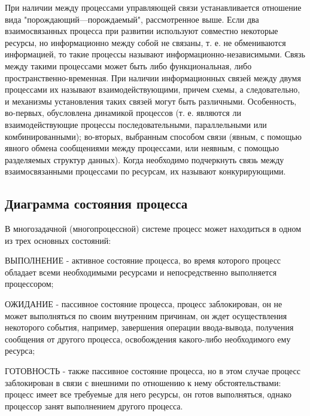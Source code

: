 При наличии между процессами управляющей связи устанавливается отношение вида "порождающий—порождаемый", рассмотренное выше. Если два взаимосвязанных процесса при развитии используют совместно некоторые ресурсы, но информационно между собой не связаны, т. е. не обмениваются информацией, то такие процессы называют информационно-независимыми. Связь между такими процессами может быть либо функциональная, либо пространственно-временная. При наличии информационных связей между двумя процессами их называют взаимодействующими, причем схемы, а следовательно, и механизмы установления таких связей могут быть различными. Особенность, во-первых, обусловлена динамикой процессов (т. е. являются ли взаимодействующие процессы последовательными, параллельными или комбинированными); во-вторых, выбранным способом связи (явным, с помощью явного обмена сообщениями между процессами, или неявным, с помощью разделяемых структур данных). Когда необходимо подчеркнуть связь между взаимосвязанными процессами по ресурсам, их называют конкурирующими.

\subsection{Диаграмма состояния процесса}

В многозадачной (многопроцессной) системе процесс может находиться в одном из трех основных состояний:

\begin{opr}
   ВЫПОЛНЕНИЕ - активное состояние процесса, во время которого процесс обладает всеми необходимыми ресурсами и непосредственно выполняется процессором;
\end{opr}

\begin{opr}
   ОЖИДАНИЕ - пассивное состояние процесса, процесс заблокирован, он не может выполняться по своим внутренним причинам, он ждет осуществления некоторого события, например, завершения операции ввода-вывода, получения сообщения от другого процесса, освобождения какого-либо необходимого ему ресурса;
\end{opr}

\begin{opr}
   ГОТОВНОСТЬ - также пассивное состояние процесса, но в этом случае процесс заблокирован в связи с внешними по отношению к нему обстоятельствами: процесс имеет все требуемые для него ресурсы, он готов выполняться, однако процессор занят выполнением другого процесса.
\end{opr}

